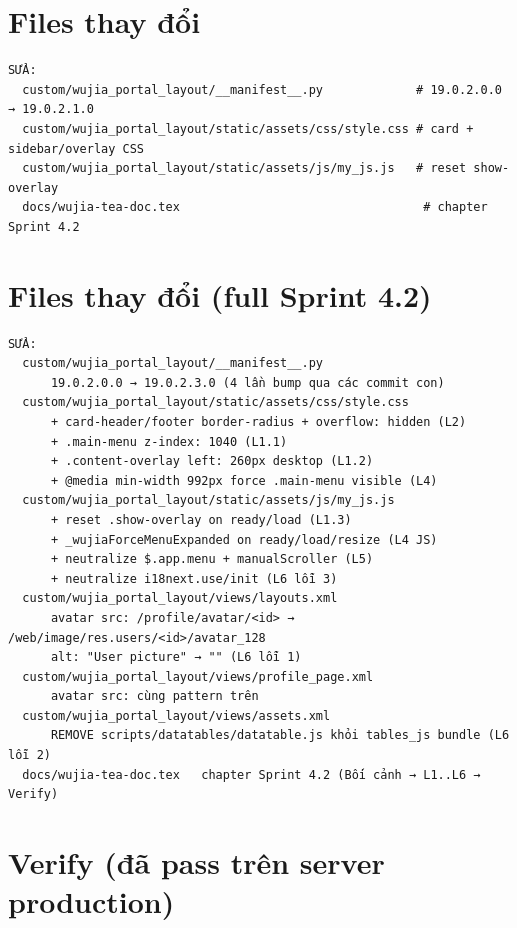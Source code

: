 \section{Files thay đổi}

\begin{lstlisting}[style=shell]
SỬA:
  custom/wujia_portal_layout/__manifest__.py             # 19.0.2.0.0 → 19.0.2.1.0
  custom/wujia_portal_layout/static/assets/css/style.css # card + sidebar/overlay CSS
  custom/wujia_portal_layout/static/assets/js/my_js.js   # reset show-overlay
  docs/wujia-tea-doc.tex                                  # chapter Sprint 4.2
\end{lstlisting}

\section{Files thay đổi (full Sprint 4.2)}

\begin{lstlisting}[style=shell]
SỬA:
  custom/wujia_portal_layout/__manifest__.py
      19.0.2.0.0 → 19.0.2.3.0 (4 lần bump qua các commit con)
  custom/wujia_portal_layout/static/assets/css/style.css
      + card-header/footer border-radius + overflow: hidden (L2)
      + .main-menu z-index: 1040 (L1.1)
      + .content-overlay left: 260px desktop (L1.2)
      + @media min-width 992px force .main-menu visible (L4)
  custom/wujia_portal_layout/static/assets/js/my_js.js
      + reset .show-overlay on ready/load (L1.3)
      + _wujiaForceMenuExpanded on ready/load/resize (L4 JS)
      + neutralize $.app.menu + manualScroller (L5)
      + neutralize i18next.use/init (L6 lỗi 3)
  custom/wujia_portal_layout/views/layouts.xml
      avatar src: /profile/avatar/<id> → /web/image/res.users/<id>/avatar_128
      alt: "User picture" → "" (L6 lỗi 1)
  custom/wujia_portal_layout/views/profile_page.xml
      avatar src: cùng pattern trên
  custom/wujia_portal_layout/views/assets.xml
      REMOVE scripts/datatables/datatable.js khỏi tables_js bundle (L6 lỗi 2)
  docs/wujia-tea-doc.tex   chapter Sprint 4.2 (Bối cảnh → L1..L6 → Verify)
\end{lstlisting}

\section{Verify (đã pass trên server production)}

